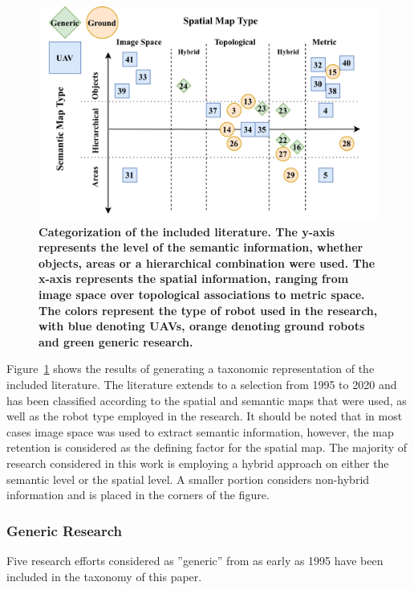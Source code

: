 \documentclass[twocolumn,letterpaper]{IEEEAerospaceCLS}  %
\begin{document}
\begin{figure}
    \centering
    \includegraphics[width=\textwidth]{Lit-17-TNR.png}
    \caption{\bf{
        Categorization of the included literature. The y-axis represents the level of the semantic information, whether objects, areas or a hierarchical combination were used. The x-axis represents the spatial information, ranging from image space over topological associations to metric space. The colors represent the type of robot used in the research, with blue denoting UAVs, orange denoting ground robots and green generic research.
    }}
    \label{fig:LitRes}
\end{figure}
Figure~\ref{fig:LitRes} shows the results of generating a taxonomic representation of the included literature. The literature extends to a selection from 1995 to 2020 and has been classified according to the spatial and semantic maps that were used, as well as the robot type employed in the research. It should be noted that in most cases image space was used to extract semantic information, however, the map retention is considered as the defining factor for the spatial map. The majority  of research considered in this work is employing a hybrid approach on either the semantic level or the spatial level. A smaller portion considers non-hybrid information and is placed in the corners of the figure.  
\subsubsection{Generic Research} \label{sssec:LitResHis}
Five research efforts considered as ''generic'' from as early as 1995  have been included in the taxonomy of this paper.
\end{document}
